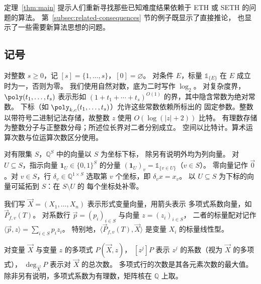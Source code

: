 定理~\ref{thm:main} 提示人们重新寻找那些已知难度结果依赖于
ETH 或 SETH 的问题的算法。
第~\ref{subsec:related-consequences} 节的例子既显示了直接推论，
也显示了一些需要新算法思想的问题。

\subsection{记号}\label{subsec:notation}
对整数 $s\ge0$，记 $[s]=\{1,\ldots,s\}$，$[0]=\varnothing$。
对条件 $E$，标量 $\mathds{1}_{\{E\}}$ 在 $E$ 成立时为一，否则为零。
我们使用自然对数，底为二时写作 $\log_2$。
对复杂度界，$\poly(t_1,\ldots,t_s)$ 表示形如
$(1+t_1+\cdots+t_s)^{O(1)}$ 的界，其中隐含常数为绝对常数。
下标（如 $\poly_{k,c}(t_1,\ldots,t_s)$）允许这些常数依赖所标出的
固定参数。整数以带符号二进制记法存储，故整数 $z$ 使用
$O(\log(|z|+2))$ 比特。
有理数存储为整数分子与正整数分母；所述位长界对二者分别成立。
空间以比特计。算术运算次数与位运算次数区分使用。

对有限集 $S$，$\mathbb Q^S$ 中的向量以 $S$ 为坐标下标，
除另有说明外均为列向量。
对 $U\subseteq S$，指示向量 $\mathbf1_U\in\{0,1\}^S$ 的分量
$(\mathbf1_U)_v=\mathds{1}_{\{v\in U\}}$（$v\in S$）。
零向量记作 $\vec{0}$。对 $v\in S$，行 $\delta_v\in\mathbb Q^{1\times S}$
选取第 $v$ 个坐标，即 $\delta_vx=x_v$。
以 $U\subseteq S$ 为下标的向量可延拓到 $S$：在 $S\setminus U$ 的
每个坐标处补零。

我们写 $\vec{X}=(X_1,\ldots,X_n)$ 表示形式变量向量，用箭头表示
多项式系数向量，如 $\vec{P}_{f,v}(T)$。
对系数行 $\vec{p}=(p_i)_{i\in S}$ 与向量 $z=(z_i)_{i\in S}$，
二者的标量配对记作 $\langle\vec{p},z\rangle=\sum_{i\in S}p_i z_i$。
特别地，$\langle\vec{P}_{f,v}(T),\vec{X}\rangle$ 是变量 $X_i$
的标量线性型。

对变量 $\vec{X}$ 与变量 $z$ 的多项式 $P(\vec{X},z)$，
$[z^j]P$ 表示 $z^j$ 的系数（视为 $\vec{X}$ 的多项式），
$\deg_{\vec{X}} P$ 表示对 $\vec{X}$ 的总次数。
多项式行的次数是其各元素次数的最大值。
除非另有说明，多项式系数为有理数，矩阵核在 $\mathbb Q$ 上取。
